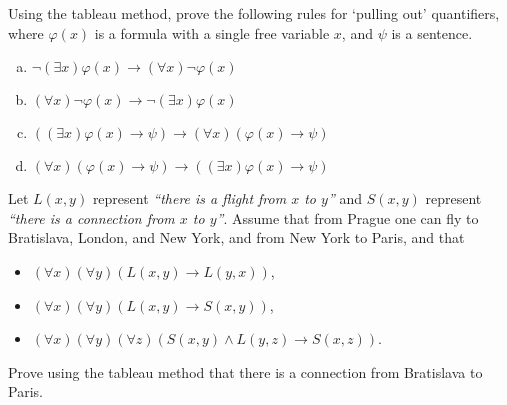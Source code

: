 \begin{problem}
    
    Using the tableau method, prove the following rules for `pulling out' quantifiers, where $\varphi(x)$ is a formula with a single free variable $x$, and $\psi$ is a sentence.

    \vspace{-6pt}
    \begin{multicols}{2}
        \begin{enumerate}[(a)]        
            \item $\neg(\exists x)\varphi(x)\to (\forall x)\neg \varphi(x)$
            \item $(\forall x)\neg \varphi(x)\to \neg(\exists x)\varphi(x)$
            \item $((\exists x)\varphi(x)\to\psi)\to(\forall x)(\varphi(x)\to \psi)$       
            \item $(\forall x)(\varphi(x)\to\psi)\to((\exists x)\varphi(x)\to \psi)$            
        \end{enumerate}
    \end{multicols}
    \vspace{-6pt}
    
\end{problem}


\begin{problem} 
    
    Let $L(x,y)$ represent \emph{``there is a flight from $x$ to $y$''} and $S(x,y)$ represent \emph{``there is a connection from $x$ to $y$''}. Assume that from Prague one can fly to Bratislava, London, and New York, and from New York to Paris, and that
    \begin{itemize}  
        \item $(\forall x)(\forall y)(L(x,y) \to L(y,x))$,
        \item $(\forall x)(\forall y)(L(x,y)\to S(x,y))$,
        \item $(\forall x)(\forall y)(\forall z)(S(x,y)\wedge L(y,z)\to S(x,z))$.
    \end{itemize}
    Prove using the tableau method that there is a connection from Bratislava to Paris.

\end{problem}



